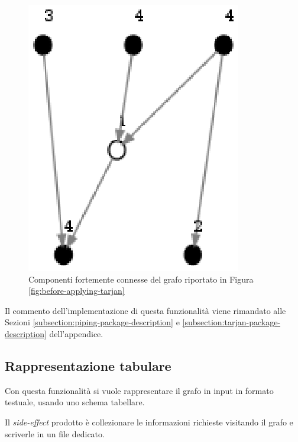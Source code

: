 \begin{figure}
  \centering
  \includegraphics{images/OnePipingLevelUnitTest_Printer_DFS_PrinterPipe_Crescenzi-phase-PrinterPipeFilter-level-2.eps}
  \caption{Componenti fortemente connesse del grafo riportato in
    Figura \ref{fig:before-applying-tarjan}}
  \label{fig:tarjan-output}
\end{figure}

Il commento dell'implementazione di questa funzionalit\`a viene
rimandato alle Sezioni \ref{subsection:piping-package-description} e
\ref{subsection:tarjan-package-description} dell'appendice.

\subsection{Rappresentazione tabulare}
\label{subsection:tabular-representation-use-case}
Con questa funzionalit\`a si vuole rappresentare il grafo in input in
formato testuale, usando uno schema tabellare.

Il \emph{side-effect} prodotto \`e collezionare le informazioni
richieste visitando il grafo e scriverle in un file dedicato.

